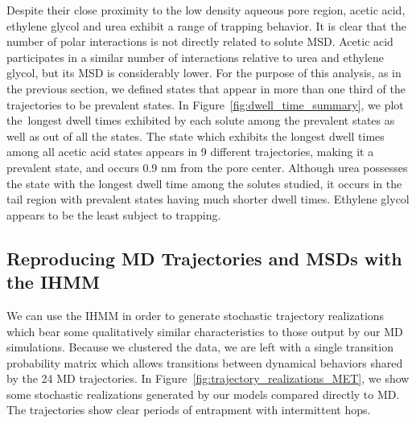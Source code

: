\documentclass[journal=jpcbfk,manuscript=article]{achemso}
\begin{document}
  Despite their close proximity to the low density aqueous pore region, acetic
  acid, ethylene glycol and urea exhibit a range of trapping behavior.
  It is clear that the number of polar interactions is not directly
  related to solute MSD. Acetic acid participates in a similar number of 
  interactions relative to urea and ethylene glycol, but its MSD is considerably
  lower. For the purpose of this analysis, as in the previous section, we 
  defined states that appear in more than one third of the trajectories to
  be prevalent states. In Figure~\ref{fig:dwell_time_summary}, we plot the\
  longest dwell times exhibited by each solute among the prevalent states as 
  well as out of all the states. The state which exhibits the longest dwell
  times among all acetic acid states appears in 9 different trajectories, 
  making it a prevalent state, and occurs 0.9 nm from the pore center.
  Although urea possesses the state with the longest dwell time among the
  solutes studied, it occurs in the tail region with prevalent states having 
  much shorter dwell times. Ethylene glycol appears to be the least subject to
  trapping.


  \subsection{Reproducing MD Trajectories and MSDs with the IHMM}

  
  We can use the IHMM in order to generate stochastic trajectory realizations
  which bear some qualitatively similar characteristics to those output
  by our MD simulations. Because we clustered the data, we are left with a 
  single transition probability matrix which allows transitions between dynamical
  behaviors shared by the 24 MD trajectories. In 
  Figure~\ref{fig:trajectory_realizations_MET}, we show some stochastic realizations
  generated by our models compared directly to MD. The trajectories show clear 
  periods of entrapment with intermittent hops.
  
\end{document}
